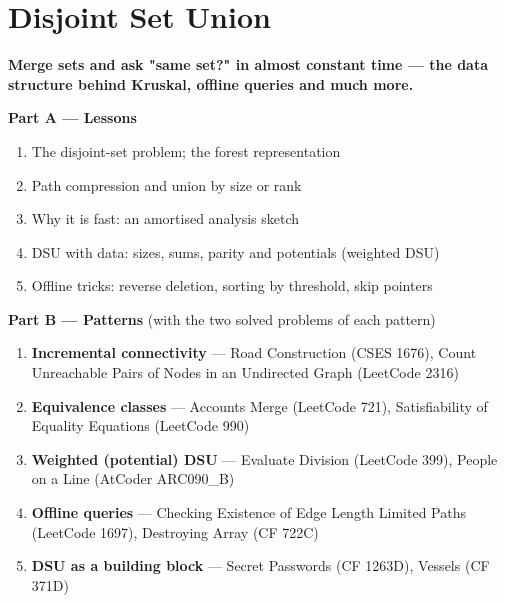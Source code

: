 \chapter{Disjoint Set Union}
\label{ch:dsu}

\begin{tcolorbox}[enhanced, colback=white, colframe=secondaryblue, boxrule=1pt, arc=2mm]
\textbf{\large\textcolor{primaryblue}{Merge sets and ask "same set?" in almost constant time --- the data structure behind Kruskal, offline queries and much more.}}
\end{tcolorbox}


\begin{plannedbox}
\textbf{Part A --- Lessons}
\begin{enumerate}[leftmargin=*, label=\textbf{A\arabic*.}, itemsep=1pt]
    \item The disjoint-set problem; the forest representation
    \item Path compression and union by size or rank
    \item Why it is fast: an amortised analysis sketch
    \item DSU with data: sizes, sums, parity and potentials (weighted DSU)
    \item Offline tricks: reverse deletion, sorting by threshold, skip pointers
\end{enumerate}
\textbf{Part B --- Patterns} (with the two solved problems of each pattern)
\begin{enumerate}[leftmargin=*, label=\textbf{P\arabic*.}, itemsep=1pt]
    \item \textbf{Incremental connectivity} --- Road Construction {\small\color{darkgray}(CSES 1676)}, Count Unreachable Pairs of Nodes in an Undirected Graph {\small\color{darkgray}(LeetCode 2316)}
    \item \textbf{Equivalence classes} --- Accounts Merge {\small\color{darkgray}(LeetCode 721)}, Satisfiability of Equality Equations {\small\color{darkgray}(LeetCode 990)}
    \item \textbf{Weighted (potential) DSU} --- Evaluate Division {\small\color{darkgray}(LeetCode 399)}, People on a Line {\small\color{darkgray}(AtCoder ARC090\_B)}
    \item \textbf{Offline queries} --- Checking Existence of Edge Length Limited Paths {\small\color{darkgray}(LeetCode 1697)}, Destroying Array {\small\color{darkgray}(CF 722C)}
    \item \textbf{DSU as a building block} --- Secret Passwords {\small\color{darkgray}(CF 1263D)}, Vessels {\small\color{darkgray}(CF 371D)}
\end{enumerate}
\end{plannedbox}
